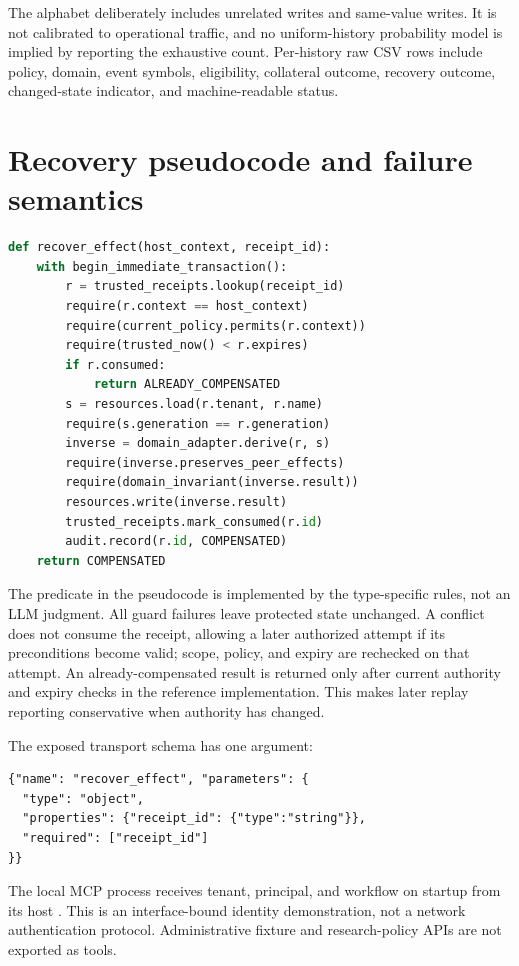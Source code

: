 \documentclass[10pt,twocolumn]{article}
\begin{document}
The alphabet deliberately includes unrelated writes and same-value writes. It is not calibrated to operational traffic, and no uniform-history probability model is implied by reporting the exhaustive count. Per-history raw CSV rows include policy, domain, event symbols, eligibility, collateral outcome, recovery outcome, changed-state indicator, and machine-readable status.

\section{Recovery pseudocode and failure semantics}
\begin{lstlisting}[language=Python]
def recover_effect(host_context, receipt_id):
    with begin_immediate_transaction():
        r = trusted_receipts.lookup(receipt_id)
        require(r.context == host_context)
        require(current_policy.permits(r.context))
        require(trusted_now() < r.expires)
        if r.consumed:
            return ALREADY_COMPENSATED
        s = resources.load(r.tenant, r.name)
        require(s.generation == r.generation)
        inverse = domain_adapter.derive(r, s)
        require(inverse.preserves_peer_effects)
        require(domain_invariant(inverse.result))
        resources.write(inverse.result)
        trusted_receipts.mark_consumed(r.id)
        audit.record(r.id, COMPENSATED)
    return COMPENSATED
\end{lstlisting}
The predicate in the pseudocode is implemented by the type-specific rules, not an LLM judgment. All guard failures leave protected state unchanged. A conflict does not consume the receipt, allowing a later authorized attempt if its preconditions become valid; scope, policy, and expiry are rechecked on that attempt. An already-compensated result is returned only after current authority and expiry checks in the reference implementation. This makes later replay reporting conservative when authority has changed.

The exposed transport schema has one argument:
\begin{lstlisting}
{"name": "recover_effect", "parameters": {
  "type": "object",
  "properties": {"receipt_id": {"type":"string"}},
  "required": ["receipt_id"]
}}
\end{lstlisting}
The local MCP process receives tenant, principal, and workflow on startup from its host \cite{mcp}. This is an interface-bound identity demonstration, not a network authentication protocol. Administrative fixture and research-policy APIs are not exported as tools.
\end{document}
